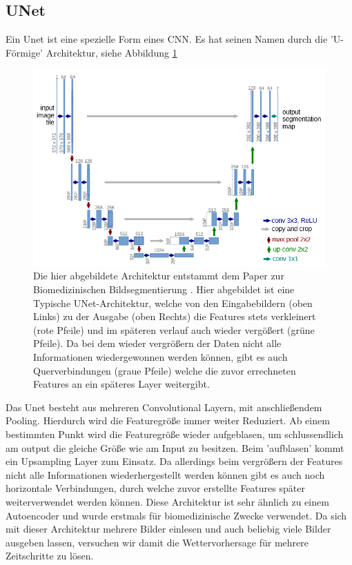 \subsection{UNet}
\label{kapitelUNet}
Ein Unet ist eine spezielle Form eines CNN. Es hat seinen Namen durch die 'U-Förmige' Architektur, siehe Abbildung \ref{imgUNetA}
\begin{figure}[h]
	\centering
	\includegraphics[width=\linewidth]{pics/UNet_Biomedical.png}
	\caption[UNet aus Paper von O. Ronneberger, P. Fischer und T. Brox]{Die hier abgebildete Architektur entstammt dem Paper zur Biomedizinischen Bildsegmentierung \cite{DBLP:journals/corr/RonnebergerFB15}. Hier abgebildet ist eine Typische UNet-Architektur, welche von den Eingabebildern (oben Links) zu der Ausgabe (oben Rechts) die Features stets verkleinert (rote Pfeile) und im späteren verlauf auch wieder vergößert (grüne Pfeile). Da bei dem wieder vergrößern der Daten nicht alle Informationen wiedergewonnen werden können, gibt es auch Querverbindungen (graue Pfeile) welche die zuvor errechneten Features an ein späteres Layer weitergibt.}
	\label{imgUNetA}
\end{figure}

Das Unet besteht aus mehreren Convolutional Layern, mit anschließendem Pooling. Hierdurch wird die Featuregröße immer weiter Reduziert. Ab einem bestimmten Punkt wird die Featuregröße wieder aufgeblasen, um schlussendlich am output die gleiche Größe wie am Input zu besitzen. Beim 'aufblasen' kommt ein Upsampling Layer zum Einsatz. Da allerdings beim vergrößern der Features nicht alle Informationen wiederhergestellt werden können gibt es auch noch horizontale Verbindungen, durch welche zuvor erstellte Features später weiterverwendet werden können.
Diese Architektur ist sehr ähnlich zu einem Autoencoder und wurde erstmals für biomedizinische Zwecke verwendet. Da sich mit dieser Architektur mehrere Bilder einlesen und auch beliebig viele Bilder ausgeben lassen, versuchen wir damit die Wettervorhersage für mehrere Zeitschritte zu lösen.

